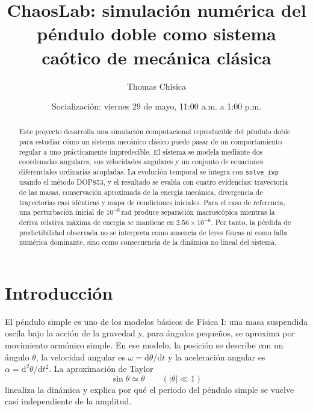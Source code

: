 \documentclass[reprint,amsmath,amssymb,aps,pra,nofootinbib,floatfix,showkeys]{revtex4-2}
\newcommand{\dd}{\mathrm{d}}
\begin{document}
\title{ChaosLab: simulaci\'on num\'erica del p\'endulo doble como sistema ca\'otico de mec\'anica cl\'asica}

\author{Thomas Chisica}
\date{Socializaci\'on: viernes 29 de mayo, 11:00 a.m. a 1:00 p.m.}

\begin{abstract}
Este proyecto desarrolla una simulaci\'on computacional reproducible del p\'endulo doble para estudiar c\'omo un sistema mec\'anico cl\'asico puede pasar de un comportamiento regular a uno pr\'acticamente impredecible. El sistema se modela mediante dos coordenadas angulares, sus velocidades angulares y un conjunto de ecuaciones diferenciales ordinarias acopladas. La evoluci\'on temporal se integra con \texttt{solve\_ivp} usando el m\'etodo DOP853, y el resultado se eval\'ua con cuatro evidencias: trayectoria de las masas, conservaci\'on aproximada de la energ\'ia mec\'anica, divergencia de trayectorias casi id\'enticas y mapa de condiciones iniciales. Para el caso de referencia, una perturbaci\'on inicial de $10^{-6}\,\mathrm{rad}$ produce separaci\'on macrosc\'opica mientras la deriva relativa m\'axima de energ\'ia se mantiene en $2.56\times 10^{-6}$. Por tanto, la p\'erdida de predictibilidad observada no se interpreta como ausencia de leyes f\'isicas ni como falla num\'erica dominante, sino como consecuencia de la din\'amica no lineal del sistema.
\end{abstract}


\maketitle

\section{Introducci\'on}

El p\'endulo simple es uno de los modelos b\'asicos de F\'isica I: una masa suspendida oscila bajo la acci\'on de la gravedad y, para \'angulos peque\~nos, se aproxima por movimiento arm\'onico simple. En ese modelo, la posici\'on se describe con un \'angulo $\theta$, la velocidad angular es $\omega=\dd\theta/\dd t$ y la aceleraci\'on angular es $\alpha=\dd^2\theta/\dd t^2$. La aproximaci\'on de Taylor
\begin{equation}
    \sin\theta \simeq \theta \qquad (|\theta|\ll 1)
    \label{eq:small-angle}
\end{equation}
linealiza la din\'amica y explica por qu\'e el periodo del p\'endulo simple se vuelve casi independiente de la amplitud.
\end{document}
